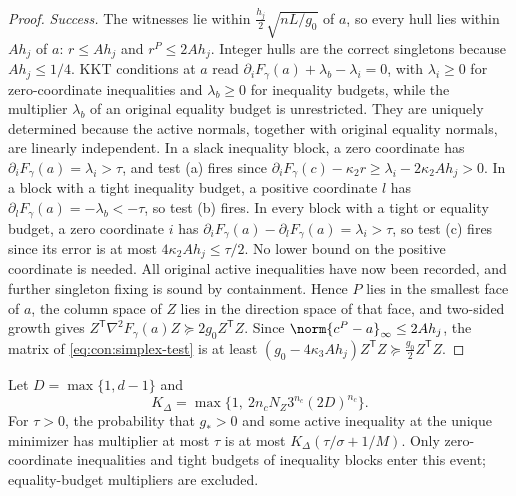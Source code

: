 \begin{proof}
\emph{Success.} The witnesses lie within $\frac{h_j}2\sqrt{nL/g_0}$ of $a$, so
every hull lies within $Ah_j$ of $a$: $r\le Ah_j$ and $r^P\le2Ah_j$. Integer
hulls are the correct singletons because $Ah_j\le1/4$. KKT conditions at $a$
read $\partial_iF_\gamma(a)+\lambda_b-\lambda_i=0$, with
$\lambda_i\ge0$ for zero-coordinate inequalities and
$\lambda_b\ge0$ for inequality budgets, while the multiplier
$\lambda_b$ of an original equality budget is unrestricted. They are
uniquely determined because the active normals, together with original
equality normals, are linearly independent. In a slack inequality block,
a zero coordinate has
$\partial_iF_\gamma(a)=\lambda_i>\tau$, and test (a) fires since
$\partial_iF_\gamma(c)-\kappa_2r\ge\lambda_i-2\kappa_2Ah_j>0$. In a block with a
tight inequality budget, a positive coordinate $l$ has
$\partial_lF_\gamma(a)=-\lambda_b<-\tau$, so test (b) fires. In every block
with a tight or equality budget, a zero coordinate $i$ has
$\partial_iF_\gamma(a)-\partial_lF_\gamma(a)=\lambda_i>\tau$, so test (c) fires
since its error is at most $4\kappa_2Ah_j\le\tau/2$. No lower bound on the
positive coordinate is needed. All original active inequalities have now
been recorded, and further singleton fixing is sound by containment. Hence
$P$ lies in the smallest face of $a$, the column space of $Z$ lies in the
direction space of that face, and two-sided growth gives
$Z^{\mathsf T}\nabla^2F_\gamma(a)Z\succeq2g_0Z^{\mathsf T}Z$. Since
$\norm{c^P-a}_\infty\le2Ah_j$, the matrix of \eqref{eq:con:simplex-test} is at
least $(g_0-4\kappa_3Ah_j)Z^{\mathsf T}Z\succeq\frac{g_0}2Z^{\mathsf T}Z$.
\end{proof}

\begin{lemma}\label{lem:con:simplex-tail}
Let $D=\max\{1,d-1\}$ and
\[
 K_\Delta=\max\{1,\ 2n_cN_Z3^{n_c}(2D)^{n_c}\}.
\]
For $\tau>0$, the probability that $g_*>0$ and some active inequality at the
unique minimizer has multiplier at most $\tau$ is at most
$K_\Delta(\tau/\sigma+1/M)$. Only zero-coordinate inequalities and tight
budgets of inequality blocks enter this event; equality-budget
multipliers are excluded.
\end{lemma}

